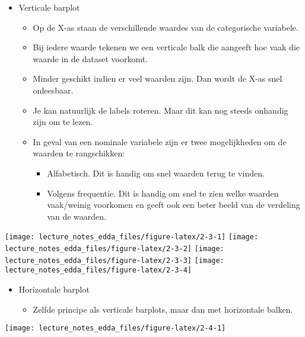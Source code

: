 \documentclass[]{memoir}
\providecommand{\tightlist}{%
  \setlength{\itemsep}{0pt}\setlength{\parskip}{0pt}}
\begin{document}
\begin{itemize}
\tightlist
\item
  Verticale barplot

  \begin{itemize}
  \tightlist
  \item
    Op de X-as staan de verschillende waardes van de categorische variabele.
  \item
    Bij iedere waarde tekenen we een verticale balk die aangeeft hoe vaak die waarde in de dataset voorkomt.
  \item
    Minder geschikt indien er veel waarden zijn. Dan wordt de X-as snel onleesbaar.
  \item
    Je kan natuurlijk de labels roteren. Maar dit kan nog steeds onhandig zijn om te lezen.
  \item
    In geval van een nominale variabele zijn er twee mogelijkheden om de waarden te rangschikken:

    \begin{itemize}
    \tightlist
    \item
      Alfabetisch. Dit is handig om snel waarden terug te vinden.
    \item
      Volgens frequentie. Dit is handig om snel te zien welke waarden vaak/weinig voorkomen en geeft ook een beter beeld van de verdeling van de waarden.
    \end{itemize}
  \end{itemize}
\end{itemize}

\texttt{[image: lecture\_notes\_edda\_files/figure-latex/2-3-1]}
\texttt{[image: lecture\_notes\_edda\_files/figure-latex/2-3-2]}
\texttt{[image: lecture\_notes\_edda\_files/figure-latex/2-3-3]}
\texttt{[image: lecture\_notes\_edda\_files/figure-latex/2-3-4]}

\begin{itemize}
\tightlist
\item
  Horizontale barplot

  \begin{itemize}
  \tightlist
  \item
    Zelfde principe als verticale barplots, maar dan met horizontale balken.
  \end{itemize}
\end{itemize}

\texttt{[image: lecture\_notes\_edda\_files/figure-latex/2-4-1]}
\end{document}
